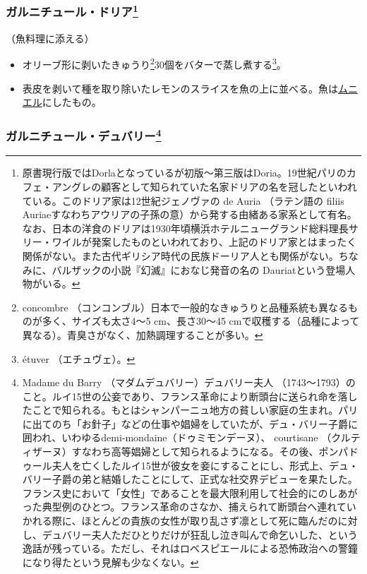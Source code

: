 \begin{recette}
\hypertarget{garniture-doria}{%
\subsubsection[ガルニチュール・ドリア]{\texorpdfstring{ガルニチュール・ドリア\footnote{原書現行版ではDorlaとなっているが初版〜第三版はDoria。19世紀パリのカフェ・アングレの顧客として知られていた名家ドリアの名を冠したといわれている。このドリア家は12世紀ジェノヴァの
  de Auria （ラテン語の filiis
  Auriaeすなわちアウリアの子孫の意）から発する由緒ある家系として有名。なお、日本の洋食のドリアは1930年頃横浜ホテルニューグランド総料理長サリー・ワイルが発案したものといわれており、上記のドリア家とはまったく関係がない。また古代ギリシア時代の民族ドーリア人とも関係がない。ちなみに、バルザックの小説『幻滅』におなじ発音の名の
  Dauriatという登場人物がいる。}}{ガルニチュール・ドリア}}\label{garniture-doria}}



（魚料理に添える）

\begin{itemize}
\item
  オリーブ形に剥いたきゅうり\footnote{concombre
    （コンコンブル）日本で一般的なきゅうりと品種系統も異なるものが多く、サイズも太さ4〜5
    cm、長さ30〜45
    cmで収穫する（品種によって異なる）。青臭さがなく、加熱調理することが多い。}30個をバターで蒸し煮する\footnote{étuver
    （エチュヴェ）。}。
\item
  表皮を剥いて種を取り除いたレモンのスライスを魚の上に並べる。魚は\protect\hyperlink{meuniere}{ムニエル}にしたもの。
\end{itemize}

\hypertarget{garniture-dubarry}{%
\subsubsection[ガルニチュール・デュバリー]{\texorpdfstring{ガルニチュール・デュバリー\footnote{Madame
  du Barry （マダムデュバリー）デュバリー夫人
  （1743〜1793）のこと。ルイ15世の公妾であり、フランス革命により断頭台に送られ命を落したことで知られる。もとはシャンパーニュ地方の貧しい家庭の生まれ。パリに出てのち「お針子」などの仕事や娼婦をしていたが、デュ・バリー子爵に囲われ、いわゆるdemi-mondaine（ドゥミモンデーヌ）、
  courtisane
  （クルティザーヌ）すなわち高等娼婦として知られるようになる。その後、ポンパドゥール夫人を亡くしたルイ15世が彼女を妾にすることにし、形式上、デュ・バリー子爵の弟と結婚したことにして、正式な社交界デビューを果たした。フランス史において「女性」であることを最大限利用して社会的にのしあがった典型例のひとつ。フランス革命のさなか、捕えられて断頭台へ連れていかれる際に、ほとんどの貴族の女性が取り乱さず凛として死に臨んだのに対し、デュバリー夫人ただひとりだけが狂乱し泣き叫んで命乞いした、という逸話が残っている。ただし、それはロベスピエールによる恐怖政治への警鐘になり得たという見解も少なくない。}}{ガルニチュール・デュバリー}}\label{garniture-dubarry}}


\end{recette}
